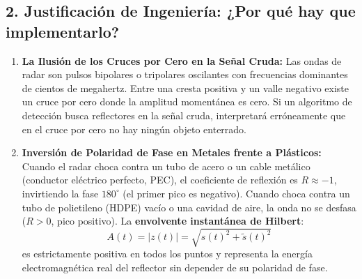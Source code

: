 \documentclass[11pt,a4paper]{article}
\begin{document}
\subsection{2. Justificación de Ingeniería: ¿Por qué hay que implementarlo?}
\begin{enumerate}
    \item \textbf{La Ilusión de los Cruces por Cero en la Señal Cruda:}
    Las ondas de radar son pulsos bipolares o tripolares oscilantes con frecuencias dominantes de cientos de megahertz. Entre una cresta positiva y un valle negativo existe un cruce por cero donde la amplitud momentánea es cero. Si un algoritmo de detección busca reflectores en la señal cruda, interpretará erróneamente que en el cruce por cero no hay ningún objeto enterrado.
    \item \textbf{Inversión de Polaridad de Fase en Metales frente a Plásticos:}
    Cuando el radar choca contra un tubo de acero o un cable metálico (conductor eléctrico perfecto, PEC), el coeficiente de reflexión es $R \approx -1$, invirtiendo la fase $180^\circ$ (el primer pico es negativo). Cuando choca contra un tubo de polietileno (HDPE) vacío o una cavidad de aire, la onda no se desfasa ($R > 0$, pico positivo). La \textbf{envolvente instantánea de Hilbert}:
    \begin{equation}
        A(t) = |z(t)| = \sqrt{s(t)^2 + \tilde{s}(t)^2}
    \end{equation}
    es estrictamente positiva en todos los puntos y representa la energía electromagnética real del reflector sin depender de su polaridad de fase.
\end{enumerate}
\end{document}
